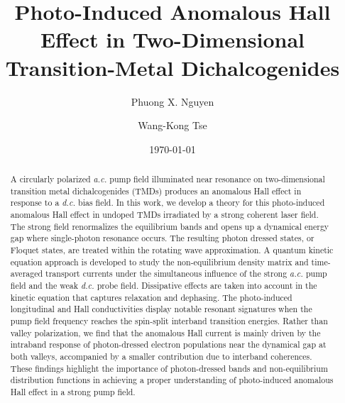 \documentclass[reprint,amsmath,amssymb,aps,prb]{revtex4-1}
\begin{document}
\title{Photo-Induced Anomalous Hall Effect in Two-Dimensional Transition-Metal
  Dichalcogenides}

\author{Phuong X. Nguyen}
\author{Wang-Kong Tse}

\date{\today}

\begin{abstract}
  A circularly polarized \textit{a.c.} pump field illuminated near resonance on two-dimensional transition metal dichalcogenides (TMDs) produces an anomalous Hall effect in response to a \textit{d.c.} bias field.  In this work, we develop a theory for this photo-induced anomalous Hall effect in undoped TMDs irradiated by a strong coherent laser field. The strong field renormalizes the equilibrium bands and opens up a dynamical energy gap where single-photon resonance occurs. The resulting photon dressed states, or Floquet states, are treated within the rotating wave approximation. 
  A quantum kinetic equation approach is developed to study the  non-equilibrium density matrix and time-averaged transport currents under the simultaneous influence of the strong \textit{a.c.} pump field and the weak \textit{d.c.} probe field. Dissipative effects are taken into account in the kinetic equation that captures relaxation and dephasing. 
  The photo-induced longitudinal and Hall conductivities display notable resonant signatures when the pump field frequency reaches the spin-split interband transition  energies. Rather than valley polarization, we find that the anomalous Hall current is mainly driven by the intraband response of photon-dressed electron populations near the dynamical gap at both valleys,
accompanied by a smaller contribution due to interband coherences. 
  These findings highlight the importance of photon-dressed bands and non-equilibrium distribution functions 
  in achieving a proper understanding of photo-induced anomalous Hall effect in a strong pump field.
\end{abstract}

\maketitle
\end{document}
